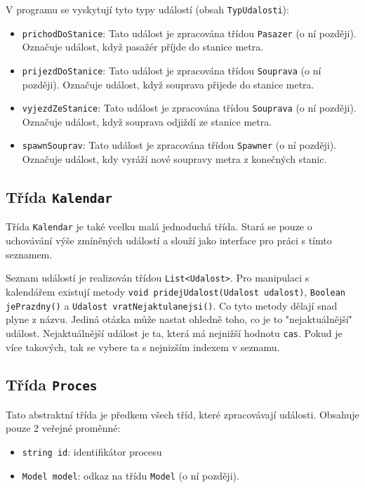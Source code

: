 \documentclass[12pt, a4paper]{article}
\begin{document}
V programu se vyskytují tyto typy událostí (obsah \texttt{TypUdalosti}):
\begin{itemize}
    \item \texttt{prichodDoStanice}: Tato událost je zpracována třídou \texttt{Pasazer} (o ní později). Označuje událost, když pasažér příjde do stanice metra.
    \item \texttt{prijezdDoStanice}: Tato událost je zpracována třídou \texttt{Souprava} (o ní později). Označuje událost, když souprava přijede do stanice metra.
    \item \texttt{vyjezdZeStanice}: Tato událost je zpracována třídou \texttt{Souprava} (o ní později). Označuje událost, když souprava odjiždí ze stanice metra.
    \item \texttt{spawnSouprav}: Tato událost je zpracována třídou \texttt{Spawner} (o ní později). Označuje událost, kdy vyráží nové soupravy metra z konečných stanic.
\end{itemize}

\subsection{Třída \texttt{Kalendar}}
Třída \texttt{Kalendar} je také vcelku malá jednoduchá třída. Stará se pouze o uchovávání výše zmíněných událostí a slouží jako interface pro práci s tímto seznamem.

Seznam událostí je realizován třídou \texttt{List<Udalost>}. Pro manipulaci s kalendářem existují metody \texttt{void pridejUdalost(Udalost udalost)}, \texttt{Boolean jePrazdny()} a \texttt{Udalost vratNejaktulanejsi()}. Co tyto metody dělají snad plyne z názvu. Jediná otázka může nastat ohledně toho, co je to "nejaktuálnější" událost. Nejaktuálnější událost je ta, která má nejnižší hodnotu \texttt{cas}. Pokud je více takových, tak se vybere ta s nejnizším indexem v seznamu.

\subsection{Třída \texttt{Proces}}
Tato abstraktní třída je předkem všech tříd, které zpracovávají události. Obsahuje pouze 2 veřejné proměnné:
\begin{itemize}
    \item \texttt{string id}: identifikátor procesu
    \item \texttt{Model model}: odkaz na třídu \texttt{Model} (o ní později).
\end{itemize}
\end{document}
